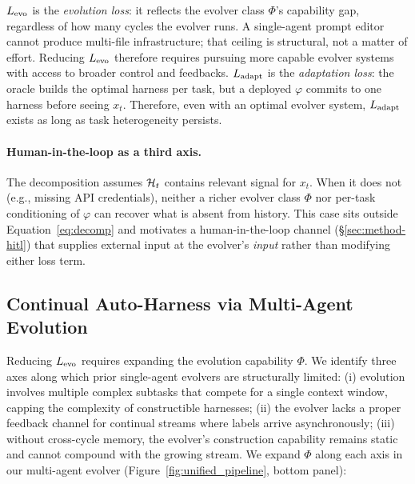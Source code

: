 $L_{\text{evo}}$ is the \emph{evolution loss}: it reflects the evolver class $\Phi$'s capability gap, regardless of how many cycles the evolver runs. A single-agent prompt editor cannot produce multi-file infrastructure; that ceiling is structural, not a matter of effort. Reducing $L_{\text{evo}}$ therefore requires pursuing more capable evolver systems with access to broader control and feedbacks. $L_{\text{adapt}}$ is the \emph{adaptation loss}: the oracle builds the optimal harness per task, but a deployed $\varphi$ commits to one harness before seeing $x_t$. Therefore, even with an optimal evolver system, $L_{\text{adapt}}$ exists as long as task heterogeneity persists.


\paragraph{Human-in-the-loop as a third axis.}
The decomposition assumes $\mathcal{H}_t$ contains relevant signal for $x_t$. When it does not (e.g., missing API credentials), neither a richer evolver class $\Phi$ nor per-task conditioning of $\varphi$ can recover what is absent from history. This case sits outside Equation~\ref{eq:decomp} and motivates a human-in-the-loop channel (\S\ref{sec:method-hitl}) that supplies external input at the evolver's \emph{input} rather than modifying either loss term.


\subsection{Continual Auto-Harness via Multi-Agent Evolution}
\label{sec:method-multi}

Reducing $L_{\text{evo}}$ requires expanding the evolution capability $\Phi$. We identify three axes along which prior single-agent evolvers are structurally limited: (i) evolution involves multiple complex subtasks that compete for a single context window, capping the complexity of constructible harnesses; (ii) the evolver lacks a proper feedback channel for continual streams where labels arrive asynchronously; (iii) without cross-cycle memory, the evolver's construction capability remains static and cannot compound with the growing stream. We expand $\Phi$ along each axis in our multi-agent evolver (Figure~\ref{fig:unified_pipeline}, bottom panel):

